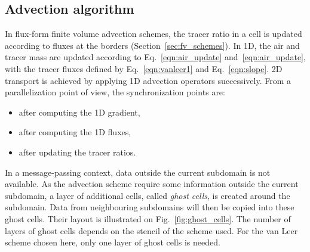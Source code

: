 \subsection{Advection algorithm}
\label{subsec:parallel_advection}
In flux-form finite volume advection schemes, the tracer ratio in a cell is
updated according to fluxes at the borders (Section~\ref{sec:fv_schemes}). In
1D, the air and tracer mass are updated according to Eq.~\ref{eqn:air_update}
and~\ref{eqn:air_update}, with the tracer fluxes defined by
Eq.~\eqref{eqn:vanleer1} and Eq.~\eqref{eqn:slope}. 2D transport is achieved by
applying 1D advection operators successively. From a parallelization point of
view, the synchronization points are:
\begin{itemize}
  \item after computing the 1D gradient,
  \item after computing the 1D fluxes,
  \item after updating the tracer ratios.
\end{itemize}
In a message-passing context, data outside the current subdomain is not available.
As the advection scheme require some information outside the current subdomain, a layer of
additional cells, called \textit{ghost cells}, is created around the subdomain. Data from neighbouring subdomains
will then be copied into these ghost cells. Their layout is illustrated
on Fig.~\ref{fig:ghost_cells}. The number of layers of ghost cells depends on
the stencil of the scheme used. For the van Leer scheme chosen here, only one
layer of ghost cells is needed.

